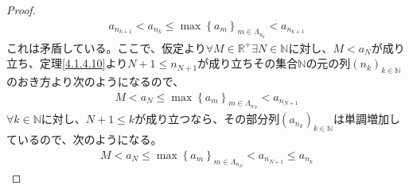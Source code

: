 \documentclass[dvipdfmx]{jsarticle}
\begin{document}
\begin{proof}
\begin{align*}
a_{n_{k + 1}} < a_{n_{k}} \leq \max\left\{ a_{m} \right\}_{m \in \varLambda_{n_{k}}} < a_{n_{k + 1}}
\end{align*}
これは矛盾している。ここで、仮定より$\forall M \in \mathbb{R}^{+}\exists N \in \mathbb{N}$に対し、$M < a_{N}$が成り立ち、定理\ref{4.1.4.10}より$N + 1 \leq n_{N + 1}$が成り立ちその集合$\mathbb{N}$の元の列$\left( n_{k} \right)_{k \in \mathbb{N}}$のおき方より次のようになるので、
\begin{align*}
M < a_{N} \leq \max\left\{ a_{m} \right\}_{m \in \varLambda_{n_{N}}} < a_{n_{N + 1}}
\end{align*}
$\forall k \in \mathbb{N}$に対し、$N + 1 \leq k$が成り立つなら、その部分列$\left( a_{n_{k}} \right)_{k \in \mathbb{N}}$は単調増加しているので、次のようになる。
\begin{align*}
M < a_{N} \leq \max\left\{ a_{m} \right\}_{m \in \varLambda_{n_{N}}} < a_{n_{N + 1}} \leq a_{n_{k}}
\end{align*}

\end{proof}
\end{document}
